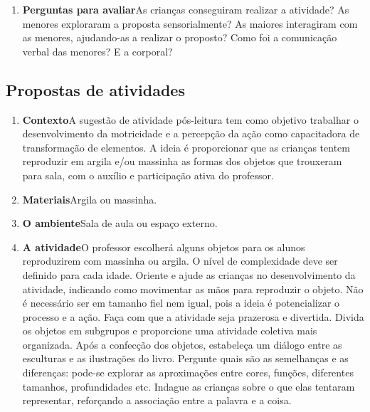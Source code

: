 \documentclass[11pt]{extarticle}
\begin{document}
\begin{enumerate}
\item \textbf{Perguntas para avaliar}\quad As crianças conseguiram realizar a atividade? As menores exploraram a proposta sensorialmente? As maiores interagiram com as menores, ajudando-as a realizar o proposto? Como foi a comunicação verbal das menores? E a corporal? 
\end{enumerate}


\subsection{Propostas de atividades}


\begin{enumerate}
\item \textbf{Contexto}\quad A sugestão de atividade pós-leitura tem como objetivo trabalhar o desenvolvimento da motricidade e a percepção da ação como capacitadora de transformação de elementos. A ideia é proporcionar que as crianças tentem reproduzir em argila e/ou massinha as formas dos objetos que trouxeram para sala, com o auxílio e participação ativa do professor.


\item \textbf{Materiais}\quad Argila ou massinha.

\item \textbf{O ambiente}\quad Sala de aula ou espaço externo.

\item \textbf{A atividade}\quad O professor escolherá alguns objetos para os alunos reproduzirem com massinha ou argila. O nível de complexidade deve ser definido para cada idade. Oriente e ajude as crianças no desenvolvimento da atividade, indicando como movimentar as mãos para reproduzir o objeto. Não é necessário ser em tamanho fiel nem igual, pois a ideia é potencializar o processo e a ação. Faça com que a atividade seja prazerosa e divertida. Divida os objetos em subgrupos e proporcione uma atividade coletiva mais organizada. Após a confecção dos objetos, estabeleça um diálogo entre as esculturas e as ilustrações do livro. Pergunte quais são as semelhanças e as diferenças: pode-se explorar as aproximações entre cores, funções, diferentes tamanhos, profundidades etc. Indague as crianças sobre o que elas tentaram representar, reforçando a associação entre a palavra e a coisa.



\end{enumerate}
\end{document}
